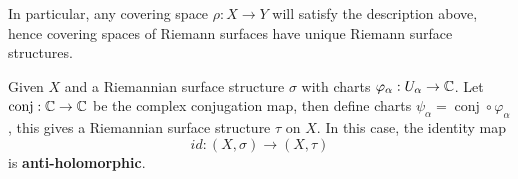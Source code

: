 \documentclass{article}
\begin{document}
\begin{remark}
    In particular, any covering space $\rho: X \to Y$ will satisfy the description above, hence covering spaces of Riemann surfaces have unique Riemann surface structures.
\end{remark}

\begin{remark}
    Given $X$ and a Riemannian surface structure $\sigma$ with charts $\varphi_\alpha: U_\alpha \to \mathbb{C}$. Let $\operatorname{conj}: \mathbb{C} \to \mathbb{C}$ be the complex conjugation map, then define charts $\psi_\alpha = \operatorname{conj} \circ \varphi_\alpha$, this gives a Riemannian surface structure $\tau$ on $X$. In this case, the identity map
    \[id: (X, \sigma) \to (X, \tau)\]
    is \textbf{anti-holomorphic}.
\end{remark}
\end{document}
